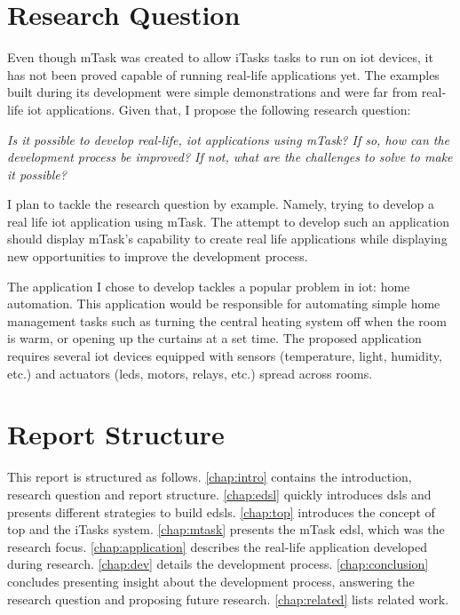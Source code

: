 \section{Research Question}
Even though \gls{mTask} was created to allow \gls{iTasks} tasks to run on \acs{iot} devices, it has not been proved capable of running real-life applications yet. The examples built during its development were simple demonstrations and were far from real-life \acs{iot} applications. Given that, I propose the following research question:

\begin{center}
\emph{Is it possible to develop real-life, \acs{iot} applications using \gls{mTask}? If so, how can the development process be improved? If not, what are the challenges to solve to make it possible?}
\end{center}
I plan to tackle the research question by example. Namely, trying to develop a real life \acs{iot} application using \gls{mTask}. The attempt to develop such an application should display \gls{mTask}'s capability to create real life applications while displaying new opportunities to improve the development process.

The application I chose to develop tackles a popular problem in \acrshort{iot}: home automation. This application would be responsible for automating simple home management tasks such as turning the central heating system off when the room is warm, or opening up the curtains at a set time. The proposed application requires several \acrshort{iot} devices equipped with sensors (temperature, light, humidity, etc.) and actuators (\acsp{led}, motors, relays, etc.) spread across rooms. 


\section{Report Structure}

This report is structured as follows. \cref{chap:intro} contains the introduction, research question and report structure. \cref{chap:edsl} quickly introduces \acp{dsl} and presents different strategies to build \acp{edsl}. \cref{chap:top} introduces the concept of \ac{top} and the \gls{iTasks} system. \cref{chap:mtask} presents the \gls{mTask} \ac{edsl}, which was the research focus. \cref{chap:application} describes the real-life application developed during research. \cref{chap:dev} details the development process. \cref{chap:conclusion} concludes presenting insight about the development process, answering the research question and proposing future research. \cref{chap:related} lists related work.

